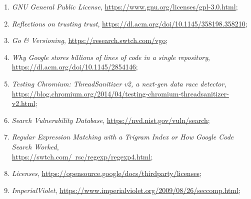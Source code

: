 \documentclass[a4paper,11pt]{article}
\begin{document}
\begin{enumerate}
\item \textit{GNU General Public License},
  \href{https://www.gnu.org/licenses/gpl-3.0.html}{https://www.gnu.org/licenses/gpl-3.0.html};



\item \textit{Reflections on trusting trust},
  \href{https://dl.acm.org/doi/10.1145/358198.358210}{https://dl.acm.org/doi/10.1145/358198.358210};



\item \textit{Go \& Versioning},
  \href{https://research.swtch.com/vgo}{https://research.swtch.com/vgo};



\item \textit{Why Google stores billions of lines of code in a single
    repository},
  \href{https://dl.acm.org/doi/10.1145/2854146}{https://dl.acm.org/doi/10.1145/2854146};



\item \textit{Testing Chromium: ThreadSanitizer v2, a next-gen data
    race
    detector}, \\
  \href{https://blog.chromium.org/2014/04/testing-chromium-threadsanitizer-v2.html}{https://blog.chromium.org/2014/04/testing-chromium-threadsanitizer-v2.html};



\item \textit{Search Vulnerability Database},
  \href{https://nvd.nist.gov/vuln/search}{https://nvd.nist.gov/vuln/search};



\item \textit{Regular Expression Matching with a Trigram Index or How
    Google Code Search Worked}, \\
  \href{https://swtch.com/~rsc/regexp/regexp4.html}{https://swtch.com/~rsc/regexp/regexp4.html};



\item \textit{Licenses},
  \href{https://opensource.google/docs/thirdparty/licenses}{https://opensource.google/docs/thirdparty/licenses};



\item \textit{ImperialViolet},
  \href{https://www.imperialviolet.org/2009/08/26/seccomp.html}{https://www.imperialviolet.org/2009/08/26/seccomp.html};




\end{enumerate}
\end{document}
